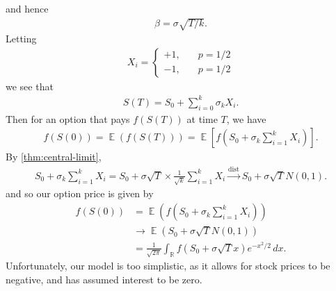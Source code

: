 \documentclass[12pt]{amsbook}
\newcommand{\rr}{\mathbb{R}}
\DeclareMathOperator{\ex}{\mathbb{E}}
\theoremstyle{plain}
\theoremstyle{definition}
\theoremstyle{remark}
\numberwithin{equation}{section}  %
\begin{document}
and hence
\begin{equation*}
	\begin{split}
		\beta = \sigma \sqrt{T/k}.
	\end{split}
\end{equation*}
Letting
\begin{equation*}
	\begin{split}
		X_{i} = 
		\begin{cases}
			+1, & \quad p=1/2 \\
			-1, & \quad p=1/2
		\end{cases}
	\end{split}
\end{equation*}
we see that
\begin{equation*}
	\begin{split}
		S(T) = S_{0} + \sum_{i = 0}^{k} \sigma_{k} X_{i}.
	\end{split}
\end{equation*}
Then for an option that pays $f(S(T))$ at time $T$, we have
\begin{equation*}
	\begin{split}
		f(S(0)) = \ex(f(S(T)))
		= \ex[f(S_{0} + \sigma_{k} \sum_{i=1}^{k} X_{i})].
	\end{split}
\end{equation*}
By \cref{thm:central-limit}, 
\begin{equation*}
	\begin{split}
		S_{0} + \sigma_{k} \sum_{i = 1}^{k} X_{i}
		= S_{0} + \sigma \sqrt{T} \times \frac{1}{\sqrt{k}} \sum_{i = 1}^{k}
		X_{i}
		\xrightarrow{\text{dist}} S_{0} + \sigma \sqrt{T} N(0,1).
	\end{split}
\end{equation*}
and so our option price is given by
\begin{equation*}
	\begin{split}
		f(S(0)) & = \ex(f(S_{0} + \sigma_{k} \sum_{i=1}^{k} X_{i}))
		\\
		& \to \ex(S_{0} + \sigma \sqrt{T}N(0,1))
		\\
		& = \frac{1}{\sqrt{2 \pi}} \int_{\rr} f(S_{0} + \sigma \sqrt{T}x)
		e^{-x^{2}/2}
		\, dx. 
	\end{split}
\end{equation*}
Unfortunately, our model is too simplistic, as it allows for stock prices to
be negative, and has assumed interest to be zero. 
\end{document}
